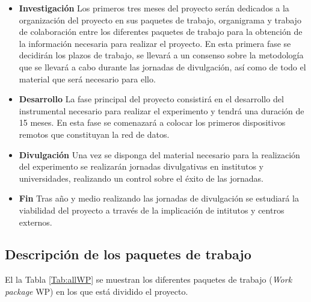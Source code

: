 \documentclass[11pt]{extarticle}
\begin{document}
				\begin{itemize}
					\item \textbf{Investigación} Los primeros tres meses del proyecto serán dedicados a la organización del proyecto en sus paquetes de trabajo, organigrama y trabajo de colaboración entre los diferentes paquetes de trabajo para la obtención de la información necesaria para realizar el proyecto. En esta primera fase se decidirán los plazos de trabajo, se llevará a un consenso sobre la metodología que se llevará a cabo durante las jornadas de divulgación, así como de todo el material que será necesario para ello.

					\item \textbf{Desarrollo} La fase principal del proyecto consistirá en el desarrollo del instrumental necesario para realizar el experimento y tendrá una duración de 15 meses. En esta fase se comenazará a colocar los primeros dispositivos remotos que constituyan la red de datos.

					\item \textbf{Divulgación} Una vez se disponga del material necesario para la realización del experimento se realizarán jornadas divulgativas en institutos y universidades, realizando un control sobre el éxito de las jornadas.

					\item \textbf{Fin} Tras año y medio realizando las jornadas de divulgación se estudiará la viabilidad del proyecto a trravés de la implicación de intitutos y centros externos.
				\end{itemize}

			\subsection{Descripción de los paquetes de trabajo}
				\label{SubSec:Imple:WP}

					El la Tabla \ref{Tab:allWP} se muestran los diferentes paquetes de trabajo (\textit{Work package} WP) en los que está dividido el proyecto.
\end{document}
